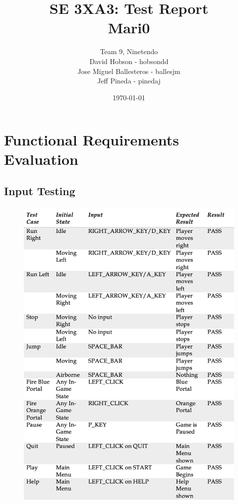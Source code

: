 \documentclass[12pt, titlepage]{article}
\title{SE 3XA3: Test Report\\Mari0}
\author{Team 9, Ninetendo
		\\ David Hobson - hobsondd
		\\ Jose Miguel Ballesteros - ballesjm
		\\ Jeff Pineda - pinedaj
}
\date{\today}
\begin{document}
\maketitle

\tableofcontents
\listoftables
\listoffigures

\newpage


\section{Functional Requirements Evaluation}

\subsection{Input Testing}


\begin{figure}[h]
   \centering
   \includegraphics[scale=0.8]{Table1.png} %
   \label{fig:table1}
\end{figure}
\end{document}
